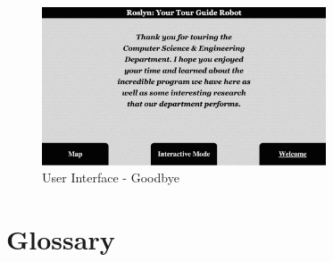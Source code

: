 \documentclass[11pt]{report}
\begin{document}
\begin{figure}[H]
 \centering
 \includegraphics[width=0.75\textwidth]{ui8.png}
 \caption{User Interface - Goodbye}
 \label{fig:ui8}
\end{figure}

\section{Glossary}
\end{document}

